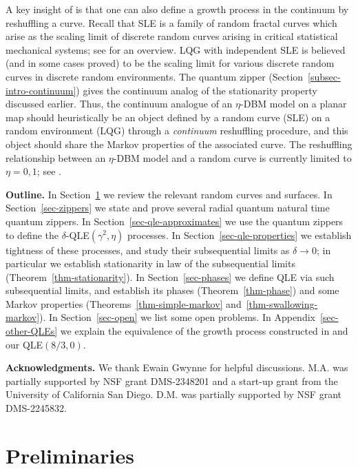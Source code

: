 \documentclass[a4paper]{article}
\numberwithin{equation}{section}
\theoremstyle{remark}
\numberwithin{equation}{section}
\begin{document}
A key insight of \cite{ms-qle} is that one can also define a growth process in the continuum by reshuffling a curve. Recall that SLE is a family of random fractal curves which arise as the scaling limit of discrete random curves arising in critical statistical mechanical systems; see \cite{lawler2008conformally} for an overview. LQG with independent SLE is believed (and in some cases proved) to be the scaling limit for various discrete random curves in discrete random environments. The quantum zipper (Section~\ref{subsec-intro-continuum}) gives the continuum analog of the stationarity property discussed earlier. Thus, the continuum analogue of an $\eta$-DBM model on a planar map should heuristically be an object defined by a random curve (SLE) on a random environment (LQG) through a \textit{continuum} reshuffling procedure, and this object should share the Markov properties of the associated curve. The reshuffling relationship between an $\eta$-DBM model and a random curve is currently limited to $\eta = 0, 1$; see \cite[Question 9.13]{ms-qle}.

\medskip 
    \noindent 
    \textbf{Outline.} In Section~\ref{sec-prelim} we review the relevant random curves and surfaces. In Section~\ref{sec-zippers} we state and prove several radial quantum natural time quantum zippers. In Section~\ref{sec-qle-approximates} we use the quantum zippers to define the $\delta$-QLE$(\gamma^2, \eta)$ processes. In Section~\ref{sec-qle-properties} we establish tightness of these processes, and study their subsequential limits  as $\delta \to 0$; in particular we establish stationarity in law of the  subsequential limits (Theorem~\ref{thm-stationarity}). In Section~\ref{sec-phases} we define QLE via such subsequential limits, and establish its phases (Theorem~\ref{thm-phase}) and some Markov properties (Theorems~\ref{thm-simple-markov} and~\ref{thm-swallowing-markov}). In Section~\ref{sec-open} we list some open problems. 
    In Appendix~\ref{sec-other-QLEs} we explain the equivalence of the growth process constructed in \cite{ms-equivalence} and our QLE$(8/3,0)$. 

\medskip 
    \noindent \textbf{Acknowledgments.} We thank Ewain Gwynne for helpful discussions. M.A. was partially supported by NSF grant DMS-2348201 and a start-up grant from the University of California San Diego. D.M. was partially supported by NSF grant DMS-2245832.
\section{Preliminaries}\label{sec-prelim}
\end{document}
